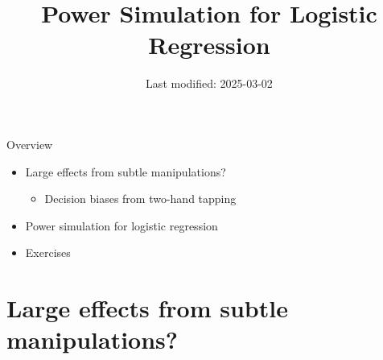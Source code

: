 \documentclass[aspectratio=169]{beamer}
\begin{document}
\title{Power Simulation for Logistic Regression}
\author{}
\date{Last modified: 2025-03-02}

\begin{frame}
\thispagestyle{empty}
\titlepage
\end{frame}


\begin{frame}{Overview}

\begin{itemize}
\item Large effects from subtle manipulations?
\begin{itemize}
\item Decision biases from two-hand tapping
\end{itemize}
\item Power simulation for logistic regression
\item Exercises
\end{itemize}

\end{frame}


\section{Large effects from subtle manipulations?}
\end{document}
